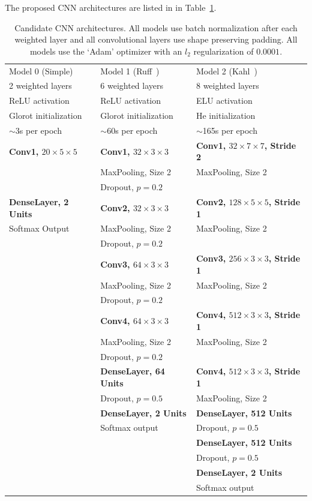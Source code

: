 The proposed CNN architectures are listed in in
Table~\ref{table:cnn_architectures}.

\begin{table}[h!t]
\begin{center}
\begin{tabular}{l l l}
\toprule
Model 0 (Simple) & Model 1 (Ruff~\cite{ruff2020automated}) & Model 2 (Kahl~\cite{kahl2017large}) \\[0.5ex]
2 weighted layers & 6 weighted layers & 8 weighted layers \\[0.5ex]
ReLU activation & ReLU activation & ELU activation \\[0.5ex]
Glorot initialization & Glorot initialization & He initialization \\[0.5ex]
$\sim$3s per epoch & $\sim$60s per epoch & $\sim$165s per epoch \\[0.5ex]
\midrule
\textbf{Conv1, $20 \times 5 \times 5$} &
\textbf{Conv1, $32 \times 3 \times 3$} &
\textbf{Conv1, $32 \times 7 \times 7$, Stride 2} \\
& MaxPooling, Size 2 & MaxPooling, Size 2 \\
& Dropout, $p=0.2$ & \\[1ex]
\textbf{DenseLayer, 2 Units} &
\textbf{Conv2, $32 \times 3 \times 3$} &
\textbf{Conv2, $128 \times 5 \times 5$, Stride 1} \\
Softmax Output & MaxPooling, Size 2 & MaxPooling, Size 2 \\
& Dropout, $p=0.2$ & \\[1ex]
& \textbf{Conv3, $64 \times 3 \times 3$} &
\textbf{Conv3, $256 \times 3 \times 3$, Stride 1} \\
& MaxPooling, Size 2 & MaxPooling, Size 2 \\
& Dropout, $p=0.2$ & \\[1ex]
& \textbf{Conv4, $64 \times 3 \times 3$} &
\textbf{Conv4, $512 \times 3 \times 3$, Stride 1} \\
& MaxPooling, Size 2 & MaxPooling, Size 2 \\
& Dropout, $p=0.2$ & \\[1ex]
& \textbf{DenseLayer, 64 Units} &
\textbf{Conv4, $512 \times 3 \times 3$, Stride 1} \\
& Dropout, $p=0.5$ & MaxPooling, Size 2 \\[1ex]
& \textbf{DenseLayer, 2 Units} &
\textbf{DenseLayer, 512 Units} \\
& Softmax output & Dropout, $p=0.5$ \\[1ex]
& & \textbf{DenseLayer, 512 Units} \\
& & Dropout, $p=0.5$ \\[1ex]
& & \textbf{DenseLayer, 2 Units} \\
& & Softmax output \\[1ex]
\bottomrule
\end{tabular}
\caption{Candidate CNN architectures. All models use batch normalization after
each weighted layer and all convolutional layers use shape preserving
padding. All models use the `Adam' optimizer with an $l_2$ regularization of
$0.0001$.}\label{table:cnn_architectures}
\end{center}
\end{table}

